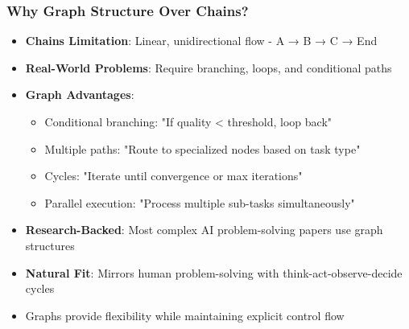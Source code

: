 \begin{frame}[fragile]\frametitle{Why Graph Structure Over Chains?}


      \begin{itemize}
        \item \textbf{Chains Limitation}: Linear, unidirectional flow - A → B → C → End
        \item \textbf{Real-World Problems}: Require branching, loops, and conditional paths
        \item \textbf{Graph Advantages}:
        \begin{itemize}
            \item Conditional branching: "If quality < threshold, loop back"
            \item Multiple paths: "Route to specialized nodes based on task type"
            \item Cycles: "Iterate until convergence or max iterations"
            \item Parallel execution: "Process multiple sub-tasks simultaneously"
        \end{itemize}
        \item \textbf{Research-Backed}: Most complex AI problem-solving papers use graph structures
        \item \textbf{Natural Fit}: Mirrors human problem-solving with think-act-observe-decide cycles
        \item Graphs provide flexibility while maintaining explicit control flow
      \end{itemize}

\end{frame}


